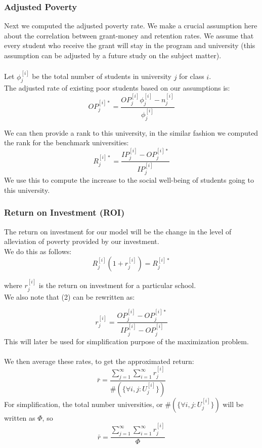 \documentclass[12pt]{scrartcl}
\begin{document}
	\subsubsection{Adjusted Poverty}
		Next we computed the adjusted poverty rate. We make a crucial assumption here about the correlation between grant-money and retention rates. We assume that every student who receive the grant will stay in the program and university (this assumption can be adjusted by a future study on the subject matter).\\
		\\
		Let $\phi_j^{[i]}$ be the total number of students in university $j$ for class $i$.\\
		The adjusted rate of existing poor students based on our assumptions is:
		\begin{equation}
			OP_j^{[i]*} = \frac{  OP_j^{[i]}\phi_j^{[i]}-n_j^{[i]}  }{ \phi_j^{[i]}  }
		\end{equation}
		
		We can then provide a rank to this university, in the similar fashion we computed the rank for the benchmark universities:
		$$
			R_j^{[i]*}=\frac{IP_j^{[i]}-OP_j^{[i]*}}{IP_j^{[i]}}
		$$
		We use this to compute the increase to the social well-being of students going to this university. 

	\subsubsection{Return on Investment (ROI)}
		The return on investment for our model will be the change in the level of alleviation of poverty provided by our investment.\\
		We do this as follows:
		\begin{equation}
			R_j^{[i]}(1+r_j^{[i]}) = R_j^{[i]*}
		\end{equation}
			
		where $r_j^{[i]}$ is the return on investment for a particular school.\\
		We also note that (2) can be rewritten as:
		
		\begin{equation}
		r_j^{[i]} = \frac{ OP_j^{[i]} - OP_j^{[i]*}  }{ IP_j^{[i]} - OP_j^{[i]}  }
		\end{equation}	
	 	This will later be used for simplification purpose of the maximization problem.\\
		\\
		We then average these rates, to get the approximated return:
		$$
			\bar{r} = \frac{ \sum_{j=1}^\infty\sum_{i=1}^\infty r_j^{[i]}  }{ \# (\{ \forall i, j :  U_j^{[i]} \}) }
		$$
		For simplification, the total number universities, or $\# (\{ \forall i, j :  U_j^{[i]} \})$ will be written as $\Phi$, so
		$$
			\bar{r} = \frac{ \sum_{j=1}^\infty\sum_{i=1}^\infty r_j^{[i]}  }{ \Phi }
		$$
\end{document}
